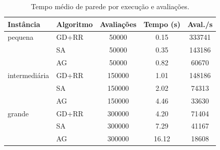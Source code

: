 \begin{table}[H]
\centering
\caption{Tempo médio de parede por execução e avaliações.}
\label{tab:tempo}
\begin{tabular}{llccc}
\toprule
Instância & Algoritmo & Avaliações & Tempo (s) & Aval./s \\
\midrule
pequena & GD+RR & 50000 & 0.15 & 333741 \\
 & SA & 50000 & 0.35 & 143186 \\
 & AG & 50000 & 0.82 & 60670 \\
\midrule
intermedi\'aria & GD+RR & 150000 & 1.01 & 148186 \\
 & SA & 150000 & 2.02 & 74313 \\
 & AG & 150000 & 4.46 & 33630 \\
\midrule
grande & GD+RR & 300000 & 4.20 & 71404 \\
 & SA & 300000 & 7.29 & 41167 \\
 & AG & 300000 & 16.12 & 18608 \\
\bottomrule
\end{tabular}
\end{table}